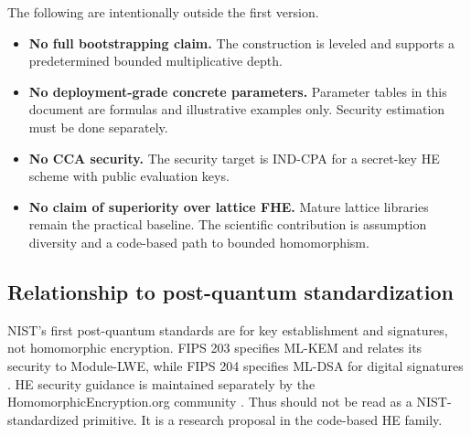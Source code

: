 The following are intentionally outside the first version.
\begin{itemize}
    \item \textbf{No full bootstrapping claim.}  The construction is leveled and supports a predetermined bounded multiplicative depth.
    \item \textbf{No deployment-grade concrete parameters.}  Parameter tables in this document are formulas and illustrative examples only.  Security estimation must be done separately.
    \item \textbf{No CCA security.}  The security target is IND-CPA for a secret-key HE scheme with public evaluation keys.
    \item \textbf{No claim of superiority over lattice FHE.}  Mature lattice libraries remain the practical baseline.  The scientific contribution is assumption diversity and a code-based path to bounded homomorphism.
\end{itemize}

\subsection{Relationship to post-quantum standardization}

NIST's first post-quantum standards are for key establishment and signatures, not homomorphic encryption.  FIPS 203 specifies ML-KEM and relates its security to Module-LWE, while FIPS 204 specifies ML-DSA for digital signatures \cite{NISTFIPS203,NISTFIPS204}.  HE security guidance is maintained separately by the HomomorphicEncryption.org community \cite{AlbrechtEtAl2024HEGuidelines,HEStandard2018}.  Thus \sable{} should not be read as a NIST-standardized primitive.  It is a research proposal in the code-based HE family.
